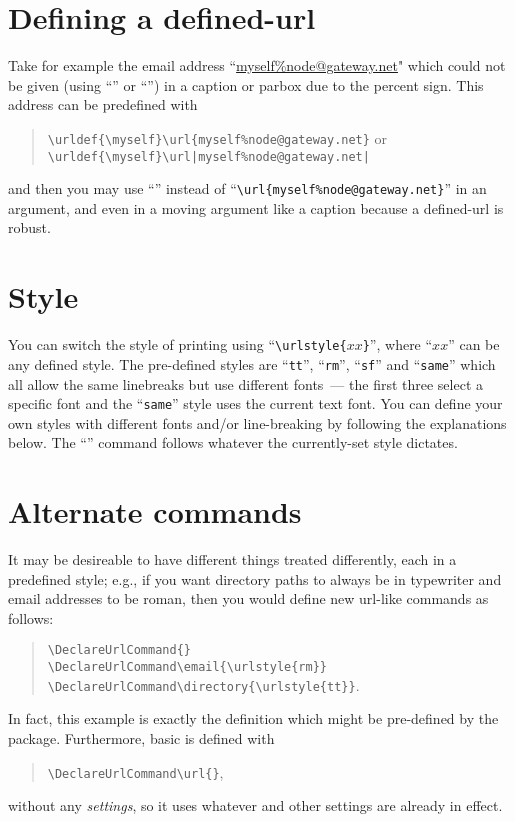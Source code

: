 \documentclass[a4paper,11pt]{article}
\begin{document}
\section{Defining a defined-url}

Take for example the email address ``\url{myself%node@gateway.net}"
which could not be given (using ``'' or ``'') in a
caption or parbox due to the percent sign.  This address can be
predefined with
\begin{quote}
  \verb|\urldef{\myself}\url{myself%node@gateway.net}| or\\
  \verb+\urldef{\myself}\url|myself%node@gateway.net|+
\end{quote}
and then you may use ``'' instead of
``\verb+\url{myself%node@gateway.net}+''
in an argument, and even in a moving argument like a caption because a
defined-url is robust.

\section{Style}

You can switch the style of printing using ``\verb+\urlstyle{+$xx$\verb+}+'',
where ``$xx$'' can be any defined style.  The pre-defined styles are 
``\texttt{tt}'', ``\texttt{rm}'', ``\texttt{sf}'' and ``\texttt{same}'' 
which all allow the same linebreaks but use different fonts~--- the 
first three select a specific font and the ``\texttt{same}'' style 
uses the current text font.  You can define your own styles with 
different fonts and/or line-breaking by following the explanations 
below.  The ``'' command follows whatever the currently-set 
style dictates.

\section{Alternate commands}

It may be desireable to have different things treated differently, each
in a predefined style; e.g., if you want directory paths to always be
in typewriter and email addresses to be roman, then you would define new
url-like commands as follows:
\begin{quote}
   \verb+\DeclareUrlCommand+\verb+{+\verb+}+\\
   \verb+\DeclareUrlCommand\email{\urlstyle{rm}}+\\
   \verb+\DeclareUrlCommand\directory{\urlstyle{tt}}+.
\end{quote}
In fact, this  example is exactly the 
definition which might be pre-defined by the package.  Furthermore,
basic  is defined with
\begin{quote}
   \verb+\DeclareUrlCommand\url{}+,
\end{quote}
without any \emph{settings}, so it uses whatever  
and other settings are already in effect.
\end{document}
